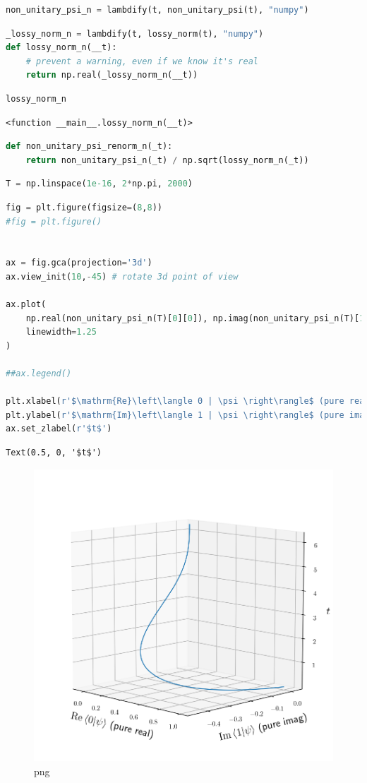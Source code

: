 \begin{lstlisting}[language=Python]
non_unitary_psi_n = lambdify(t, non_unitary_psi(t), "numpy")
\end{lstlisting}

\begin{lstlisting}[language=Python]
_lossy_norm_n = lambdify(t, lossy_norm(t), "numpy")
def lossy_norm_n(__t):
    # prevent a warning, even if we know it's real
    return np.real(_lossy_norm_n(__t))
\end{lstlisting}

\begin{lstlisting}[language=Python]
lossy_norm_n
\end{lstlisting}

\begin{lstlisting}
<function __main__.lossy_norm_n(__t)>
\end{lstlisting}

\begin{lstlisting}[language=Python]
def non_unitary_psi_renorm_n(_t):
    return non_unitary_psi_n(_t) / np.sqrt(lossy_norm_n(_t))
\end{lstlisting}

\begin{lstlisting}[language=Python]
T = np.linspace(1e-16, 2*np.pi, 2000)
\end{lstlisting}

\begin{lstlisting}[language=Python]
fig = plt.figure(figsize=(8,8))
#fig = plt.figure()


ax = fig.gca(projection='3d')
ax.view_init(10,-45) # rotate 3d point of view

ax.plot(
    np.real(non_unitary_psi_n(T)[0][0]), np.imag(non_unitary_psi_n(T)[1][0]), T,
    linewidth=1.25
)

##ax.legend()

plt.xlabel(r'$\mathrm{Re}\left\langle 0 | \psi \right\rangle$ (pure real)', labelpad=8)
plt.ylabel(r'$\mathrm{Im}\left\langle 1 | \psi \right\rangle$ (pure imag)', labelpad=10)
ax.set_zlabel(r'$t$')
\end{lstlisting}

\begin{lstlisting}
Text(0.5, 0, '$t$')
\end{lstlisting}

\begin{figure}
\centering
\includegraphics[width=0.6\linewidth]{output_30_1.png}
\caption{png}
\end{figure}

